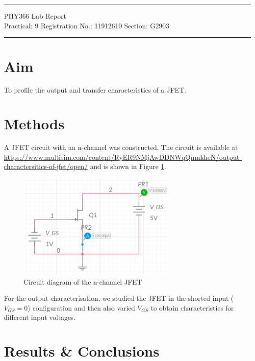 \documentclass{article}
\begin{document}
	
	\author{Aayush Arya}
	\date{(Submitted: \today)}
	\title{}
	
	\maketitle
	
	\hrule
	\begin{center}
		PHY366 Lab Report\\
		Practical: 9 \quad Registration No.: 11912610 \quad Section: G2903
	\end{center}
	\hrule
	
	\section*{Aim}
	To profile the output and transfer characteristics of a JFET.
	
	\section*{Methods}
	
	A JFET circuit with an n-channel was constructed. The circuit is available at \url{https://www.multisim.com/content/RyER9NMjAwDDNWqQmnkheN/output-charactersitics-of-jfet/open/} and is shown in Figure \ref{fig:circuit}.
	
	\begin{figure}[!h]
		\centering
		\includegraphics[width=0.7\textwidth]{jfet_circuit}
		\caption{Circuit diagram of the n-channel JFET}
		\label{fig:circuit}
	\end{figure}
	
	For the output characterisation, we studied the JFET in the shorted input ($V_{GS} =0$) configuration and then also varied $V_{GS}$ to obtain characteristics for different input voltages.
	
	\section*{Results \& Conclusions}
	
\end{document}
